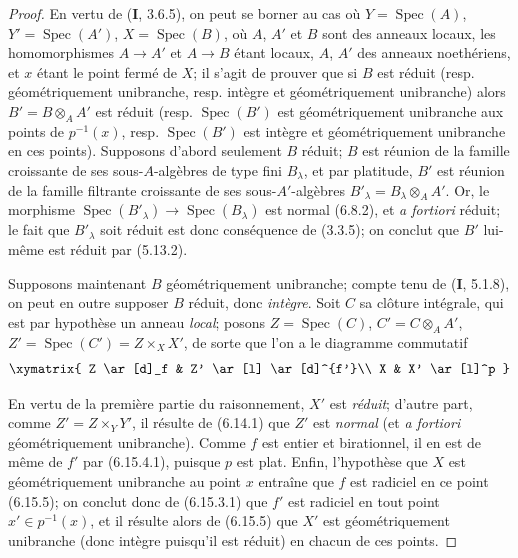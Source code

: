 \begin{proof}
En vertu de (\textbf{I}, 3.6.5), on peut se borner au cas où
$Y=\operatorname{Spec}(A)$, $Y'=\operatorname{Spec}(A')$,
$X=\operatorname{Spec}(B)$, où $A$, $A'$ et $B$ sont des anneaux locaux,
les homomorphismes $A\to A'$ et $A\to B$ étant locaux, $A$, $A'$ des
anneaux noethériens, et $x$ étant le point fermé de $X$; il s'agit de
prouver que si $B$ est réduit (resp. géométriquement unibranche, resp.
intègre et géométriquement unibranche) alors $B'=B\otimes_A A'$ est réduit
(resp. $\operatorname{Spec}(B')$ est géométriquement unibranche aux points
de $p^{-1}(x)$, resp. $\operatorname{Spec}(B')$ est intègre et
géométriquement unibranche en ces points). Supposons d'abord seulement
$B$ réduit; $B$ est réunion de la famille croissante de ses
sous-$A$-algèbres de type fini $B_\lambda$, et par platitude, $B'$ est
réunion de la famille filtrante croissante de ses sous-$A'$-algèbres
$B'_\lambda=B_\lambda\otimes_A A'$. Or, le morphisme
$\operatorname{Spec}(B'_\lambda)\to\operatorname{Spec}(B_\lambda)$ est
normal (6.8.2), et \emph{a fortiori} réduit; le fait que $B'_\lambda$ soit réduit
est donc conséquence de (3.3.5); on conclut que $B'$ lui-même est réduit par
(5.13.2).

Supposons maintenant $B$ géométriquement unibranche; compte tenu de (\textbf{I},
5.1.8), on peut en outre supposer $B$ réduit, donc \emph{intègre}. Soit $C$ sa
clôture intégrale, qui est par hypothèse un anneau \emph{local}; posons
$Z=\operatorname{Spec}(C)$, $C'=C\otimes_A A'$,
$Z'=\operatorname{Spec}(C')=Z\times_X X'$, de sorte que l'on a le diagramme
commutatif
\[
\xymatrix{
Z \ar[d]_f & Z' \ar[l] \ar[d]^{f'}\\
X & X' \ar[l]^p
}
\]

En vertu de la première partie du raisonnement, $X'$ est \emph{réduit}; d'autre
part, comme $Z'=Z\times_Y Y'$, il résulte de (6.14.1) que $Z'$ est \emph{normal}
(et \emph{a fortiori} géométriquement unibranche). Comme $f$ est entier et
birationnel, il en est de même de $f'$ par (6.15.4.1), puisque $p$ est
plat. Enfin, l'hypothèse que $X$ est géométriquement unibranche au point
$x$ entraîne que $f$ est radiciel en ce point (6.15.5); on conclut donc de
(6.15.3.1) que $f'$ est radiciel en tout point $x'\in p^{-1}(x)$, et il
résulte alors de (6.15.5) que $X'$ est géométriquement unibranche (donc
intègre puisqu'il est réduit) en chacun de ces points.
\end{proof}


